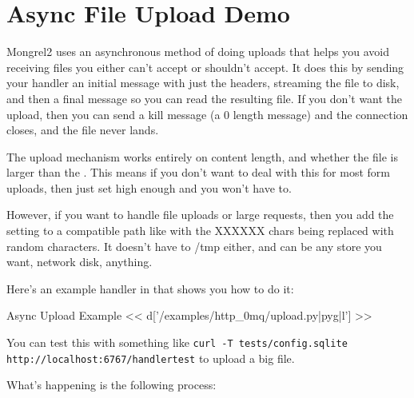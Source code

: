 \section{Async File Upload Demo}

Mongrel2 uses an asynchronous method of doing uploads that helps you 
avoid receiving files you either can't accept or shouldn't accept.  It does
this by sending your handler an initial message with just the headers, streaming
the file to disk, and then a final message so you can read the resulting file.
If you don't want the upload, then you can send a kill message (a 0 length message)
and the connection closes, and the file never lands.

The upload mechanism works entirely on content length, and whether the file
is larger than the .  This means if you don't
want to deal with this for most form uploads, then just set 
high enough and you won't have to.

However, if you want to handle file uploads or large requests, then you add
the setting  to a  compatible path
like  with the XXXXXX chars being replaced
with random characters.  It doesn't have to /tmp either, and can be any store
you want, network disk, anything.

Here's an example handler in  that shows
you how to do it:

\begin{code}{Async Upload Example}
<< d['/examples/http_0mq/upload.py|pyg|l'] >>
\end{code}

You can test this with something like
\verb|curl -T tests/config.sqlite http://localhost:6767/handlertest| to upload a big file.

What's happening is the following process:

